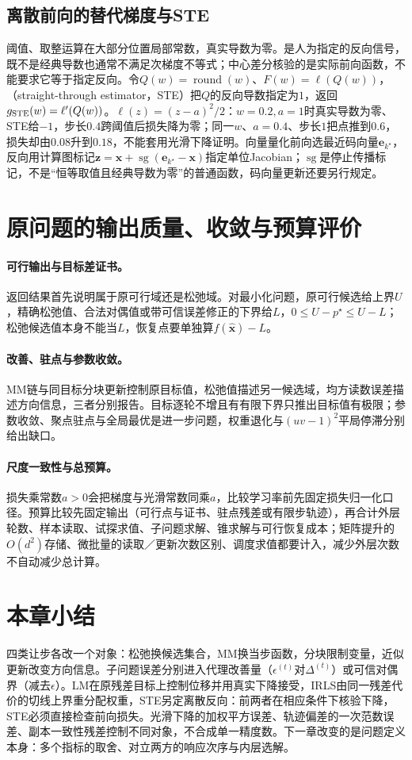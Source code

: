 \subsection{离散前向的替代梯度与STE}

阈值、取整运算在大部分位置局部常数，真实导数为零。是人为指定的反向信号，既不是经典导数也通常不满足次梯度不等式；中心差分核验的是实际前向函数，不能要求它等于指定反向。令$Q(w)=\operatorname{round}(w)$、$F(w)=\ell(Q(w))$，（straight-through estimator，STE）把$Q$的反向导数指定为$1$，返回$g_{\rm STE}(w)=\ell'(Q(w))$。$\ell(z)=(z-a)^2/2$：$w=0.2,a=1$时真实导数为零、STE给$-1$，步长$0.4$跨阈值后损失降为零；同一$w$、$a=0.4$、步长$1$把点推到$0.6$，损失却由$0.08$升到$0.18$，不能套用光滑下降证明。向量量化前向选最近码向量$\bm e_{k^\star}$，反向用计算图标记$\bm z=\bm x+\operatorname{sg}(\bm e_{k^\star}-\bm x)$指定单位Jacobian；$\operatorname{sg}$是停止传播标记，不是“恒等取值且经典导数为零”的普通函数，码向量更新还要另行规定。

\section{原问题的输出质量、收敛与预算评价}

\paragraph{可行输出与目标差证书。}
返回结果首先说明属于原可行域还是松弛域。对最小化问题，原可行候选给上界$U$，精确松弛值、合法对偶值或带可信误差修正的下界给$L$，$0\leq U-p^\star\leq U-L$；松弛候选值本身不能当$L$，恢复点要单独算$f(\widehat{\bm x})-L$。

\paragraph{改善、驻点与参数收敛。}
MM链与同目标分块更新控制原目标值，松弛值描述另一候选域，均方读数误差描述方向信息，三者分别报告。目标逐轮不增且有有限下界只推出目标值有极限；参数收敛、聚点驻点与全局最优是进一步问题，权重退化与$(uv-1)^2$平局停滞分别给出缺口。

\paragraph{尺度一致性与总预算。}
损失乘常数$a>0$会把梯度与光滑常数同乘$a$，比较学习率前先固定损失归一化口径。预算比较先固定输出（可行点与证书、驻点残差或有限步轨迹），再合计外层轮数、样本读取、试探求值、子问题求解、锥求解与可行恢复成本；矩阵提升的$O(d^2)$存储、微批量的读取／更新次数区别、调度求值都要计入，减少外层次数不自动减少总计算。

\section{本章小结}

四类让步各改一个对象：松弛换候选集合，MM换当步函数，分块限制变量，近似更新改变方向信息。子问题误差分别进入代理改善量（$\epsilon^{(t)}$对$\Delta^{(t)}$）或可信对偶界（减去$\epsilon$）。LM在原残差目标上控制位移并用真实下降接受，IRLS由同一残差代价的切线上界重分配权重，STE另定离散反向：前两者在相应条件下核验下降，STE必须直接检查前向损失。光滑下降的加权平方误差、轨迹偏差的一次范数误差、副本一致性残差控制不同对象，不合成单一精度数。下一章改变的是问题定义本身：多个指标的取舍、对立两方的响应次序与内层选解。
